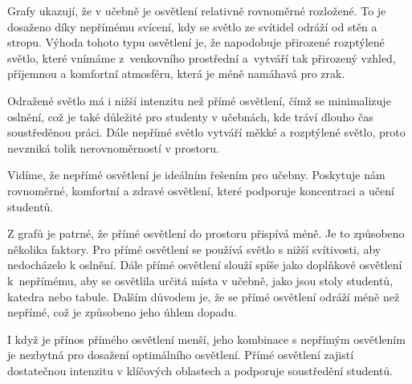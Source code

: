 
Grafy ukazují, že v učebně je osvětlení relativně rovnoměrné rozložené.
To je dosaženo díky nepřímému svícení, kdy se světlo ze svítidel odráží od stěn a stropu.
Výhoda tohoto typu osvětlení je, že napodobuje přirozené rozptýlené světlo, které vnímáme z~venkovního prostřední
a~vytváří tak přirozený vzhled, příjemnou a komfortní atmosféru, která je méně namáhavá pro zrak.

Odražené světlo má i nižší intenzitu než přímé osvětlení, čímž se minimalizuje oslnění, což je také důležité pro
studenty v učebnách, kde tráví dlouho čas soustředěnou práci.
Dále nepřímé světlo vytváří měkké a rozptýlené světlo, proto nevzniká tolik nerovnoměrností v prostoru.

Vidíme, že nepřímé osvětlení je ideálním řešením pro učebny. Poskytuje nám rovnoměrné,
komfortní a zdravé osvětlení, které podporuje koncentraci a učení studentů.

\medskip {}

Z grafů je patrné, že přímé osvětlení do prostoru přispívá méně. Je to způsobeno několika faktory.
Pro přímé osvětlení se používá světlo s nižší svítivosti, aby nedocházelo k oslnění.
Dále přímé osvětlení slouží spíše jako doplňkové osvětlení k~nepřímému, aby se osvětlila určitá místa v učebně,
jako jsou stoly studentů, katedra nebo tabule. Dalším důvodem je, že se přímé osvětlení odráží
méně než nepřímé, což je způsobeno jeho úhlem dopadu.

I když je přínos přímého osvětlení menší, jeho kombinace s nepřímým osvětlením je nezbytná pro dosažení
optimálního osvětlení. Přímé osvětlení zajistí dostatečnou intenzitu v klíčových oblastech a podporuje soustředění studentů.








